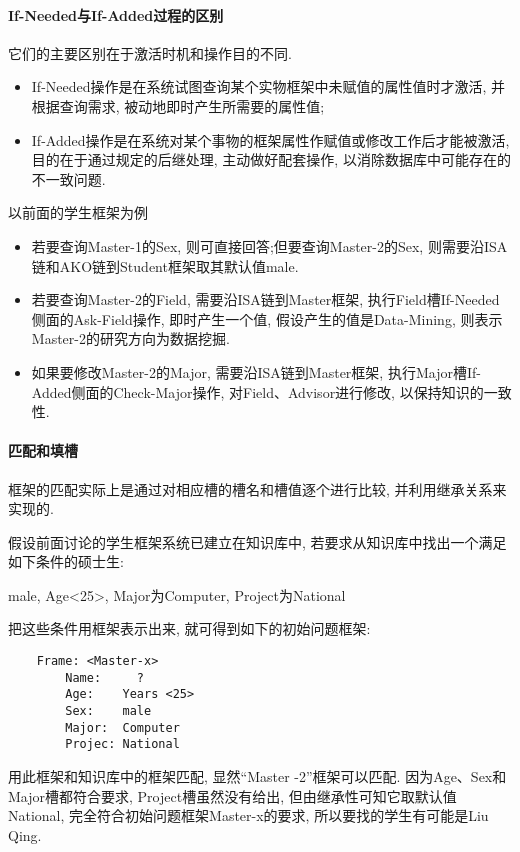\paragraph{If-Needed与If-Added过程的区别}
    它们的主要区别在于激活时机和操作目的不同.
\begin{itemize}
    \item If-Needed操作是在系统试图查询某个实物框架中未赋值的属性值时才激活, 并根据查询需求, 被动地即时产生所需要的属性值;
    \item If-Added操作是在系统对某个事物的框架属性作赋值或修改工作后才能被激活, 目的在于通过规定的后继处理, 主动做好配套操作, 以消除数据库中可能存在的不一致问题.
\end{itemize}
\begin{example}
以前面的学生框架为例
\begin{itemize}
    \item 若要查询Master-1的Sex, 则可直接回答;但要查询Master-2的Sex, 则需要沿ISA链和AKO链到Student框架取其默认值male.
    \item 若要查询Master-2的Field, 需要沿ISA链到Master框架, 执行Field槽If-Needed侧面的Ask-Field操作, 即时产生一个值, 假设产生的值是Data-Mining, 则表示Master-2的研究方向为数据挖掘.
    \item 如果要修改Master-2的Major, 需要沿ISA链到Master框架, 执行Major槽If-Added侧面的Check-Major操作, 对Field、Advisor进行修改, 以保持知识的一致性.
\end{itemize}
\end{example}
\paragraph{匹配和填槽}
    框架的匹配实际上是通过对相应槽的槽名和槽值逐个进行比较, 并利用继承关系来实现的.
\begin{example}
    假设前面讨论的学生框架系统已建立在知识库中, 若要求从知识库中找出一个满足如下条件的硕士生:
\begin{center}
    male, Age<25>, Major为Computer, Project为National
\end{center}
    把这些条件用框架表示出来, 就可得到如下的初始问题框架:
\begin{Verbatim}
    Frame: <Master-x>
        Name:     ?
        Age:    Years <25>
        Sex:    male
        Major:  Computer
        Projec: National
\end{Verbatim}
\end{example}
    用此框架和知识库中的框架匹配, 显然“Master -2”框架可以匹配. 因为Age、Sex和Major槽都符合要求, Project槽虽然没有给出, 但由继承性可知它取默认值National, 完全符合初始问题框架Master-x的要求, 所以要找的学生有可能是Liu Qing.
